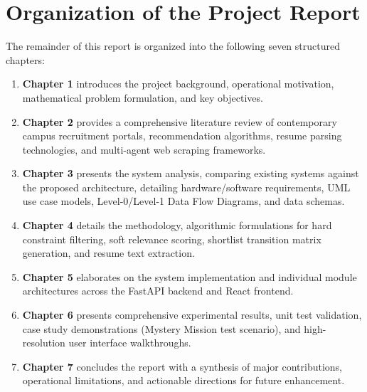 \section{Organization of the Project Report} \label{S1.6}
The remainder of this report is organized into the following seven structured chapters:
\begin{enumerate}[label=\textbf{\roman*)}]
	\item \textbf{Chapter 1} introduces the project background, operational motivation, mathematical problem formulation, and key objectives.
	\item \textbf{Chapter 2} provides a comprehensive literature review of contemporary campus recruitment portals, recommendation algorithms, resume parsing technologies, and multi-agent web scraping frameworks.
	\item \textbf{Chapter 3} presents the system analysis, comparing existing systems against the proposed architecture, detailing hardware/software requirements, UML use case models, Level-0/Level-1 Data Flow Diagrams, and data schemas.
	\item \textbf{Chapter 4} details the methodology, algorithmic formulations for hard constraint filtering, soft relevance scoring, shortlist transition matrix generation, and resume text extraction.
	\item \textbf{Chapter 5} elaborates on the system implementation and individual module architectures across the FastAPI backend and React frontend.
	\item \textbf{Chapter 6} presents comprehensive experimental results, unit test validation, case study demonstrations (Mystery Mission test scenario), and high-resolution user interface walkthroughs.
	\item \textbf{Chapter 7} concludes the report with a synthesis of major contributions, operational limitations, and actionable directions for future enhancement.
\end{enumerate}
